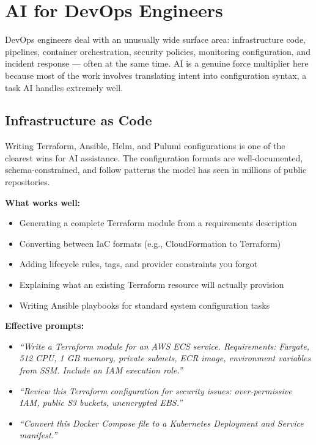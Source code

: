 \chapter{AI for DevOps Engineers}
\label{ch:devops}

DevOps engineers deal with an unusually wide surface area: infrastructure code,
pipelines, container orchestration, security policies, monitoring configuration, and
incident response --- often at the same time.
AI is a genuine force multiplier here because most of the work involves translating
intent into configuration syntax, a task AI handles extremely well.

\section{Infrastructure as Code}
\label{sec:iac}

Writing Terraform, Ansible, Helm, and Pulumi configurations is one of the clearest
wins for AI assistance.
The configuration formats are well-documented, schema-constrained, and follow patterns
the model has seen in millions of public repositories.

\textbf{What works well:}
\begin{itemize}
  \item Generating a complete Terraform module from a requirements description
  \item Converting between IaC formats (e.g., CloudFormation to Terraform)
  \item Adding lifecycle rules, tags, and provider constraints you forgot
  \item Explaining what an existing Terraform resource will actually provision
  \item Writing Ansible playbooks for standard system configuration tasks
\end{itemize}

\textbf{Effective prompts:}
\begin{itemize}
  \item \textit{``Write a Terraform module for an AWS ECS service. Requirements: Fargate, 512 CPU, 1 GB memory, private subnets, ECR image, environment variables from SSM. Include an IAM execution role.''}
  \item \textit{``Review this Terraform configuration for security issues: over-permissive IAM, public S3 buckets, unencrypted EBS.''}
  \item \textit{``Convert this Docker Compose file to a Kubernetes Deployment and Service manifest.''}
\end{itemize}

